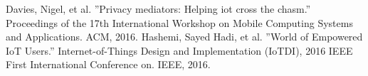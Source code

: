  Davies, Nigel, et al. ''Privacy mediators: Helping iot cross the chasm.'' Proceedings of the 17th International Workshop on Mobile Computing Systems and Applications. ACM, 2016.
 Hashemi, Sayed Hadi, et al. ''World of Empowered IoT Users.'' Internet-of-Things Design and Implementation (IoTDI), 2016 IEEE First International Conference on. IEEE, 2016.